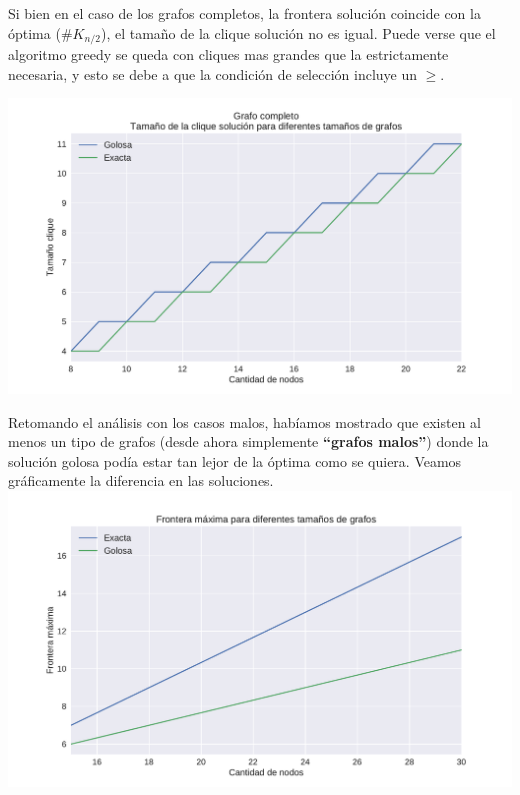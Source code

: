 Si bien en el caso de los grafos completos, la frontera solución coincide con la óptima ($\#K_{n/2}$), el tamaño de la clique solución no es igual. Puede verse que el algoritmo greedy se queda con cliques mas grandes que la estrictamente necesaria, y esto se debe a que la condición de selección incluye un $\geq$.

{\centering
    \includegraphics[width=1\textwidth]{informe/imgs/exp_completo_clique_greedy_exacta.pdf} \\
}

Retomando el análisis con los casos malos, habíamos mostrado que existen al menos un tipo de grafos (desde ahora simplemente \textbf{``grafos malos''}) donde la solución golosa podía estar tan lejor de la óptima como se quiera. Veamos gráficamente la diferencia en las soluciones. \\

{\centering
    \includegraphics[width=1\textwidth]{informe/imgs/exp_malo_frontera_greedy_exacta.pdf} \\
}
$ $\newline

